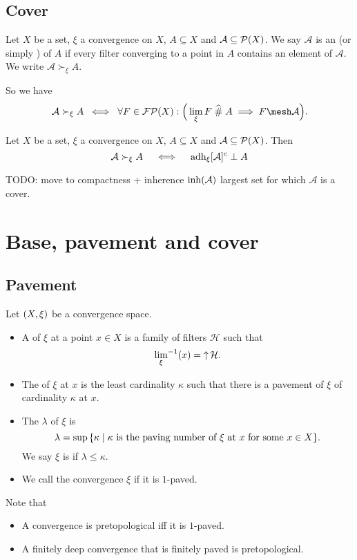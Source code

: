 \subsection{Cover}
\begin{definition}
Let $X$ be a set, $\xi$ a convergence on $X$, $A\subseteq X$ and $\mathcal{A}\subseteq \operatorname{\mathcal{P}}(X)$.
We say $\mathcal{A}$ is an  (or simply ) of $A$ if every filter converging to a point in $A$ contains an element of $\mathcal{A}$. We write $\mathcal{A} \succ_\xi A$.
\end{definition}
So we have
\[ \mathcal{A} \succ_\xi A \;\iff\; \forall F\in \powerfilters(X): \Big( \lim_\xi F \amesh A \implies F \mesh \mathcal{A} \Big). \]

\begin{proposition}
Let $X$ be a set, $\xi$ a convergence on $X$, $A\subseteq X$ and $\mathcal{A}\subseteq \operatorname{\mathcal{P}}(X)$. Then
\[ \mathcal{A} \succ_\xi A \quad\iff\quad \operatorname{adh}_\xi [\mathcal{A}]^c \perp A \]
\end{proposition}


TODO: move to compactness + inherence $\operatorname{inh}(\mathcal{A})$ largest set for which $\mathcal{A}$ is a cover.


\section{Base, pavement and cover}
\subsection{Pavement}
\begin{definition}
Let $\sSet{X,\xi}$ be a convergence space.
\begin{itemize}
\item A  of $\xi$ at a point $x\in X$ is a family of filters $\mathcal{H}$ such that
\[ {\lim_\xi}^{-1}(x) = \operatorname{\uparrow}\mathcal{H}. \]
\item The  of $\xi$ at $x$ is the least cardinality $\kappa$ such that there is a pavement of $\xi$ of cardinality $\kappa$ at $x$.
\item The  $\lambda$ of $\xi$ is
\[ \lambda = \sup\setbuilder{\kappa}{\text{$\kappa$ is the paving number of $\xi$ at $x$ for some $x\in X$}}. \]
We say $\xi$ is  if $\lambda \leq \kappa$.
\item We call the convergence $\xi$  if it is $1$-paved.
\end{itemize}
\end{definition}
Note that
\begin{itemize}
\item A convergence is pretopological iff it is $1$-paved.
\item A finitely deep convergence that is finitely paved is pretopological.
\end{itemize}

